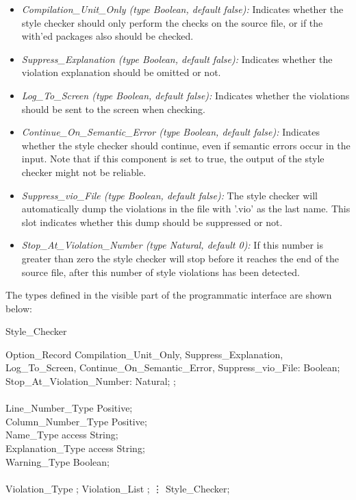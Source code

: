 \begin{itemize}

\item {\it Compilation\_Unit\_Only (type Boolean, default false):} Indicates whether the
style checker should only perform the checks on the source file, or if
the with'ed packages also should be checked.

\item {\it Suppress\_Explanation (type Boolean, default false):} Indicates whether 
the violation explanation should be omitted or not.

\item {\it Log\_To\_Screen (type Boolean, default false):} Indicates whether the violations should
be sent to the screen when checking.

\item {\it Continue\_On\_Semantic\_Error (type Boolean, default false):} Indicates whether the
style checker should continue, even if semantic errors occur in the input. Note
that if this component is set to true,
the output of the style checker might not be reliable.

\item {\it Suppress\_vio\_File (type Boolean, default false):} The style checker will 
automatically dump the violations in the file with '.vio' as the 
last name. This slot indicates whether this dump should be suppressed or 
not.

\item {\it Stop\_At\_Violation\_Number (type Natural, default 0):} If this
number is greater than zero 
 the style checker will
stop before it reaches the end of the source file, after this number of
style violations has been detected.

\end{itemize}

\noindent
The types defined in the visible part of the programmatic interface are
shown below:

\apebegin\bhinge
\Package Style_Checker \Is

   \Type Option_Record \Is \Record
      Compilation_Unit_Only,
      Suppress_Explanation,
      Log_To_Screen,
      Continue_On_Semantic_Error,
      Suppress_vio_File: Boolean;
      Stop_At_Violation_Number: Natural;
   \End \Record;\\
\\
   \Subtype Line_Number_Type \Is Positive;\\
   \Subtype Column_Number_Type \Is Positive;\\
   \Type Name_Type \Is access String;\\
   \Type Explanation_Type \Is access String;\\
   \Subtype Warning_Type \Is Boolean;\\
\\
   \Type Violation_Type \Is \Private;
   \Type Violation_List \Is \Private;
   \vdots
\End Style_Checker;
\apeend

